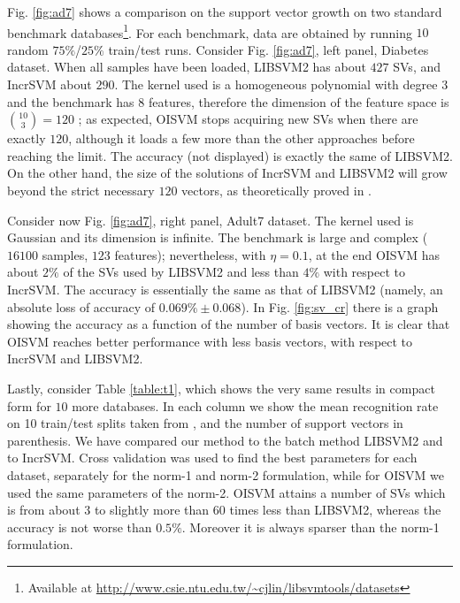 Fig. \ref{fig:ad7} shows a comparison on the support vector growth on two
standard benchmark databases\footnote{Available at
\url{http://www.csie.ntu.edu.tw/~cjlin/libsvmtools/datasets}}. For
each benchmark, data are obtained by running $10$ random $75\%$/$25\%$
train/test runs. Consider Fig. \ref{fig:ad7}, left panel, Diabetes dataset. When all
samples have been loaded, LIBSVM2 has about $427$ SVs, and IncrSVM
about $290$. The kernel used is a homogeneous polynomial with degree
$3$ and the benchmark has $8$ features, therefore the dimension of the
feature space is $\binom{10}{3} = 120$ \cite{Cristianini00};
as expected, OISVM stops acquiring new SVs when there are exactly
$120$, although it loads a few more than the other approaches before
reaching the limit. The accuracy (not displayed) is exactly the
same of LIBSVM2. On the other hand, the size of the solutions of
IncrSVM and LIBSVM2 will grow beyond the strict necessary $120$ vectors,
as theoretically proved in \cite{Steinwart03}.

Consider now Fig. \ref{fig:ad7}, right panel, Adult7 dataset. The
kernel used is Gaussian and its dimension is infinite. The benchmark
is large and complex ($16100$ samples, $123$ features); nevertheless,
with $\eta=0.1$, at the end OISVM has about $2\%$ of the SVs used by
LIBSVM2 and less than $4\%$ with respect to IncrSVM. The accuracy is
essentially the same as that of LIBSVM2 (namely, an absolute loss of
accuracy of $0.069\%\pm0.068$). In Fig. \ref{fig:sv_cr} there is a graph
showing the accuracy as a function of the number of basis vectors.
It is clear that OISVM reaches better performance with less basis vectors,
with respect to IncrSVM and LIBSVM2.

Lastly, consider Table \ref{table:t1}, which shows the very same results
in compact form for $10$ more databases. In each column we
show the mean recognition rate on 10 train/test splits taken from
\cite{Ratsch05}, and the number of support vectors in parenthesis. We
have compared our method to the batch method LIBSVM2 and to IncrSVM.
Cross validation was used to find the best parameters for each dataset,
separately for the norm-1 and norm-2 formulation, while for OISVM we used the same
parameters of the norm-2. OISVM attains a number of SVs which is
from about $3$ to slightly more than $60$ times less than LIBSVM2, whereas
the accuracy is not worse than $0.5\%$. Moreover it is always sparser
than the norm-1 formulation.

